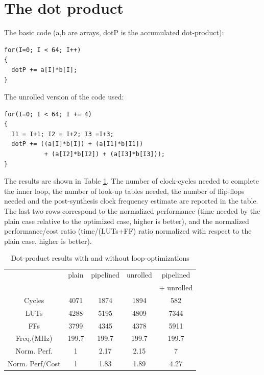 \documentclass[conference]{IEEEtran}
\begin{document}
\section{The dot product}

The basic code (a,b are arrays, dotP is the accumulated dot-product):
\begin{verbatim}
for(I=0; I < 64; I++)
{
  dotP += a[I]*b[I];
}
\end{verbatim}

The unrolled version of the code used:
\begin{verbatim}
for(I=0; I < 64; I += 4)
{
  I1 = I+1; I2 = I+2; I3 =I+3;
  dotP += ((a[I]*b[I]) + (a[I1]*b[I1]) 
           + (a[I2]*b[I2]) + (a[I3]*b[I3]));
}
\end{verbatim}

The results are shown in Table \ref{table:dotP}.   The number of clock-cycles
needed to complete the inner loop, the number of look-up tables needed, the
 number of flip-flops needed and the post-synthesis clock frequency estimate
are reported in the table.  The last two rows correspond to the normalized
performance (time needed by the plain case relative to the optimized case, higher is better),
and the normalized performance/cost ratio (time/(LUTs+FF)  ratio normalized
with respect to the plain case, higher is better).
\begin{table}[htb]
  \centering
  \caption{Dot-product results with and without loop-optimizations}
  \label{table:dotP}
  \renewcommand\arraystretch{1.2}
  \setlength{\tabcolsep}{1ex}
  \begin{tabular}{c|c|c|c|c}
  \hline
  & plain & pipelined & unrolled & pipelined  \\
  &       &           &          & + unrolled\\
  \hline

Cycles   &    4071  &   1874  &     1894  &     582 \\
LUTs     &   4288   &   5195  &     4809  &    7344 \\
FFs      &    3799  &   4345  &     4378  &    5911 \\
Freq.(MHz)  & 199.7  &    199.7 &      199.7 &    199.7 \\
Norm. Perf. & 1      &  2.17  & 2.15 & 7 \\
Norm. Perf/Cost & 1  &  1.83  & 1.89 & 4.27 \\
\hline
  \end{tabular}
\end{table}
\end{document}
